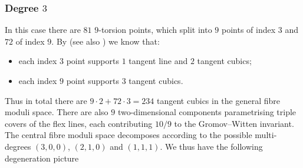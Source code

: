 \documentclass[11pt]{amsart}
\theoremstyle{definition}
\theoremstyle{definition}
\begin{document}
\subsubsection{Degree $3$} \label{sec: deg 3 degeneration} In this case there are $81$ $9$-torsion points, which split into $9$ points of index $3$ and $72$ of index $9$. By \cite[Proposition 1.5]{TakahashiCurvesComplement} (see also \cite{RanUnisecant}) we know that:
\begin{itemize}
\item each index $3$ point supports $1$ tangent line and $2$ tangent cubics;
\item each index $9$ point supports $3$ tangent cubics.	
\end{itemize}
Thus in total there are $9\cdot 2 + 72 \cdot 3 = 234$ tangent cubics in the general fibre moduli space. There are also $9$ two-dimensional components parametrising triple covers of the flex lines, each contributing $10/9$ to the Gromov--Witten invariant. The central fibre moduli space decomposes according to the possible multi-degrees $(3,0,0)$, $(2,1,0)$ and $(1,1,1)$. We thus have the following degeneration picture\newpage
\end{document}
